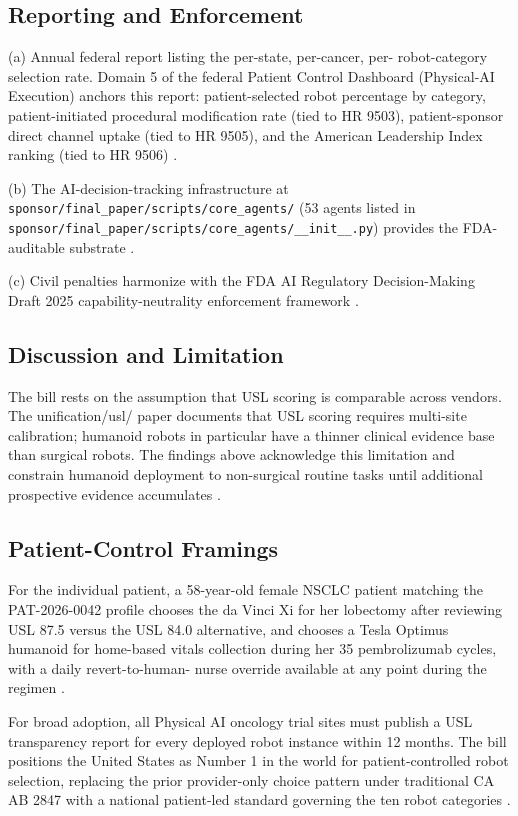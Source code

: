 \subsection{Reporting and Enforcement}

\hspace{0.5cm} (a) Annual federal report listing the per-state, per-cancer, per-
robot-category selection rate. Domain 5 of the federal Patient
Control Dashboard (Physical-AI Execution) anchors this report:
patient-selected robot percentage by category, patient-initiated
procedural modification rate (tied to HR 9503), patient-sponsor
direct channel uptake (tied to HR 9505), and the American Leadership
Index ranking (tied to HR 9506) \cite{kawchak_2026_18810541,
kawchak_2026_18778219, kawchak_2026_19244918}.

(b) The AI-decision-tracking infrastructure at
\texttt{sponsor/final\_paper/scripts/core\_agents/} (53 agents listed
in
\texttt{sponsor/final\_paper/scripts/core\_agents/\_\_init\_\_.py})
provides the FDA-auditable substrate \cite{kawchak_2026_19396256}.

(c) Civil penalties harmonize with the FDA AI Regulatory Decision-Making Draft 2025 capability-neutrality enforcement framework
\cite{fda_ai_regulatory_decision_draft_2025}.

\subsection{Discussion and Limitation}

\hspace{0.5cm} The bill rests on the assumption that USL scoring is comparable
across vendors. The unification/usl/ paper documents that USL scoring
requires multi-site calibration; humanoid robots in particular have
a thinner clinical evidence base than surgical robots. The findings
above acknowledge this limitation and constrain humanoid deployment
to non-surgical routine tasks until additional prospective evidence
accumulates \cite{kawchak_2026_18778219}.

\subsection{Patient-Control Framings}

\hspace{0.5cm} For the individual patient, a 58-year-old female NSCLC patient
matching the PAT-2026-0042 profile chooses the da Vinci Xi for her
lobectomy after reviewing USL 87.5 versus the USL 84.0 alternative,
and chooses a Tesla Optimus humanoid for home-based vitals collection
during her 35 pembrolizumab cycles, with a daily revert-to-human-
nurse override available at any point during the regimen
\cite{dronca2026cancer_care_beyond_walls, kawchak_2026_19119939}.

For broad adoption, all Physical AI oncology trial sites must
publish a USL transparency report for every deployed robot instance
within 12 months. The bill positions the United States as Number 1
in the world for patient-controlled robot selection, replacing the
prior provider-only choice pattern under traditional CA AB 2847 with
a national patient-led standard governing the ten robot categories
\cite{kawchak_2026_18810541, kawchak_2026_19176370}.

